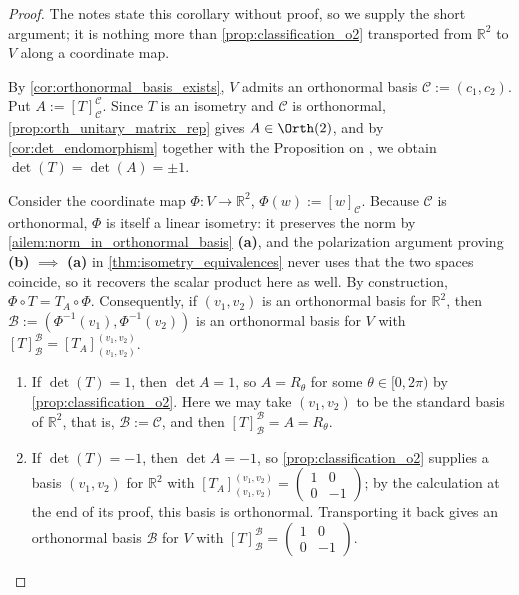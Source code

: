 \begin{proof}
The notes state this corollary without proof, so we supply the short argument; it is nothing more than \cref{prop:classification_o2} transported from $\mathbb{R}^2$ to $V$ along a coordinate map.

By \cref{cor:orthonormal_basis_exists}, $V$ admits an orthonormal basis $\mathcal{C} := (c_1, c_2)$. Put $A := [T]_{\mathcal{C}}^{\mathcal{C}}$. Since $T$ is an isometry and $\mathcal{C}$ is orthonormal, \cref{prop:orth_unitary_matrix_rep} gives $A \in \Orth(2)$, and by \cref{cor:det_endomorphism} together with the Proposition on , we obtain $\det(T) = \det(A) = \pm 1$.

Consider the coordinate map $\Phi \colon V \to \mathbb{R}^2$, $\Phi(w) := [w]_{\mathcal{C}}$. Because $\mathcal{C}$ is orthonormal, $\Phi$ is itself a linear isometry: it preserves the norm by \cref{ailem:norm_in_orthonormal_basis} \textbf{(a)}, and the polarization argument proving \textbf{(b)} $\implies$ \textbf{(a)} in \cref{thm:isometry_equivalences} never uses that the two spaces coincide, so it recovers the scalar product here as well. By construction, $\Phi \circ T = T_A \circ \Phi$. Consequently, if $(v_1, v_2)$ is an orthonormal basis for $\mathbb{R}^2$, then $\mathcal{B} := (\Phi^{-1}(v_1), \Phi^{-1}(v_2))$ is an orthonormal basis for $V$ with $[T]_{\mathcal{B}}^{\mathcal{B}} = [T_A]_{(v_1, v_2)}^{(v_1, v_2)}$.

\begin{enumerate}[label=\textbf{(\alph*)}]
    \item If $\det(T) = 1$, then $\det A = 1$, so $A = R_\theta$ for some $\theta \in [0, 2\pi)$ by \cref{prop:classification_o2}. Here we may take $(v_1, v_2)$ to be the standard basis of $\mathbb{R}^2$, that is, $\mathcal{B} := \mathcal{C}$, and then $[T]_{\mathcal{B}}^{\mathcal{B}} = A = R_\theta$.
    \item If $\det(T) = -1$, then $\det A = -1$, so \cref{prop:classification_o2} supplies a basis $(v_1, v_2)$ for $\mathbb{R}^2$ with $[T_A]_{(v_1, v_2)}^{(v_1, v_2)} = \left(\begin{smallmatrix} 1 & 0 \\ 0 & -1 \end{smallmatrix}\right)$; by the calculation at the end of its proof, this basis is orthonormal. Transporting it back gives an orthonormal basis $\mathcal{B}$ for $V$ with $[T]_{\mathcal{B}}^{\mathcal{B}} = \left(\begin{smallmatrix} 1 & 0 \\ 0 & -1 \end{smallmatrix}\right)$.
\end{enumerate}
\end{proof}

